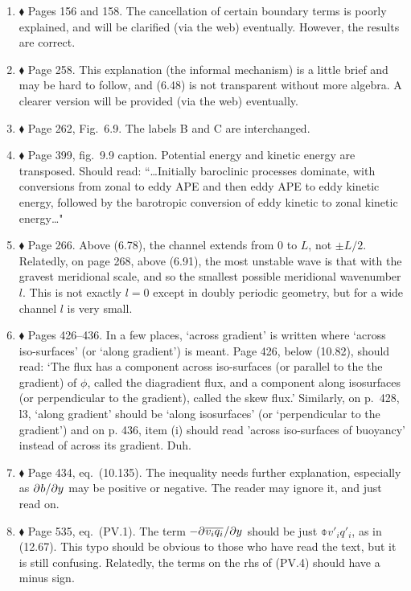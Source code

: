 \documentclass[10pt]{article}
\newcommand{\eq}{eq.\ } \newcommand{\Eq}{Eq.\ }
\renewcommand{\star}{\ensuremath{\blacklozenge} }
\begin{document}
\begin{enumerate}

\item \star \label{cancel} Pages 156 and 158. The cancellation of certain boundary terms is poorly explained, and will be clarified (via the web) eventually. However, the results are correct.

\item \star \label{informal} Page 258. This explanation (the informal mechanism) is a little brief and may be hard to follow, and (6.48) is not transparent without more algebra. A clearer version will be provided (via the web) eventually.

\item \star \label{eadyschem} Page 262, Fig.\ 6.9. The labels {\sf B} and {\sf C} are interchanged.

\item \star \label{simmhosk} Page 399, fig.\ 9.9 caption.  Potential energy and kinetic energy are transposed. Should read: ``\ldots Initially baroclinic processes dominate, with conversions from zonal to eddy APE and then eddy APE to eddy kinetic energy, followed by the barotropic conversion of eddy kinetic to zonal kinetic energy\ldots"

\item \star \label{channel} Page 266. Above (6.78), the channel extends from $0$ to $L$, not $\pm L/2$. Relatedly, on page 268, above (6.91), the most unstable wave is that with the gravest meridional scale, and so the smallest possible meridional wavenumber $l$. This is not exactly $l=0$ except in doubly periodic geometry, but for a wide channel $l$ is very small.


\item \star Pages 426--436. In a few places, `across gradient' is written where `across iso-surfaces' (or `along gradient') is meant. Page 426, below (10.82), should read: `The flux has a component across iso-surfaces (or parallel to the the gradient) of $\phi$, called the diagradient flux, and a component along isosurfaces (or perpendicular to the gradient), called the skew flux.' Similarly, on p.\ 428, l3, `along gradient' should be `along isosurfaces' (or `perpendicular to the gradient') and on p. 436, item (i) should read 'across iso-surfaces of buoyancy' instead of across its gradient. Duh.

\item \star Page 434, \eq (10.135). The inequality needs further explanation, especially as ${\partial^{} b / \partial y^{}} $ may be positive or negative.  The reader may ignore it, and just read on.

\item \star Page 535, \eq (PV.1). The term $-{\partial^{} \overline{v_i q_i}^{} / \partial y^{}}$ should be just $\obar{v'_i q'_i}$, as in (12.67). This typo should be obvious to those who have read the text, but it is still confusing. Relatedly, the terms on the rhs of (PV.4) should have a minus sign.

\end{enumerate}
\end{document}
